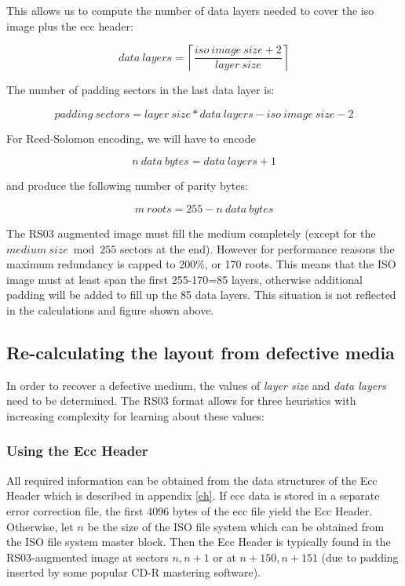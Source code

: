 This allows us to compute the number of data layers needed to cover the iso image plus the ecc header:

\[data\ layers =  \left\lceil\frac{iso\ image\ size + 2}{layer\ size}\right\rceil\]

The number of padding sectors in the last data layer is:

\[padding\ sectors = layer\ size * data\ layers - iso\ image\ size - 2\]

For Reed-Solomon encoding, we will have to encode 

\[n\ data\ bytes = data\ layers + 1\]

and produce the following number of parity bytes:

\[m\ roots = 255 - n\ data\ bytes\]

The RS03 augmented image must fill the medium completely (except for the 
$medium\ size \bmod 255$ sectors  at the end). However for performance
reasons the maximum redundancy is capped to 200\%, or 170 roots. This means
that the ISO image must at least span the first 255-170=85 layers, otherwise
additional padding will be added to fill up the 85 data layers. This situation
is not reflected in the calculations and figure shown above.

\subsection{Re-calculating the layout from defective media}
\label{recover}

In order to recover a defective medium, the values of {\em layer size}
and {\em data layers} need to be determined. The RS03 format allows
for three heuristics with increasing complexity for learning about these
values:

\subsubsection{Using the Ecc Header}

All required information can be obtained from the data structures of the
Ecc Header which is described in appendix \ref{eh}. 
If ecc data is stored in a separate error correction
file, the first 4096 bytes of the ecc file yield the Ecc Header.
Otherwise, let $n$ be the size of the ISO file system which
can be obtained from the ISO file system master block. Then the 
Ecc Header is typically found in the RS03-augmented image at sectors $n,n+1$ 
or at $n+150,n+151$ (due to padding inserted by some popular CD-R  mastering
software). \smallskip

